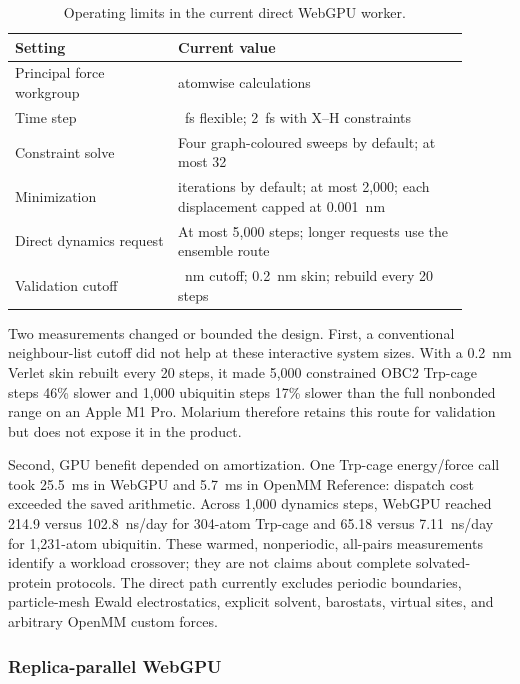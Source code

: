 \begin{table}[htbp]
  \centering
  \caption{Operating limits in the current direct WebGPU worker.}
  \label{tab:direct-operating-limits}
  \footnotesize
  \renewcommand{\arraystretch}{1.06}
  \begin{tabular}{@{}>{\raggedright\arraybackslash}p{0.32\linewidth}
                       >{\raggedright\arraybackslash}p{0.58\linewidth}@{}}
    \toprule
    Setting & Current value \\
    \midrule
    Principal force workgroup & 64 atomwise calculations \\
    Time step & 1~fs flexible; 2~fs with X--H constraints \\
    Constraint solve & Four graph-coloured sweeps by default; at most 32 \\
    Minimization & 750 iterations by default; at most 2,000; each displacement
      capped at 0.001~nm \\
    Direct dynamics request & At most 5,000 steps; longer requests use the
      ensemble route \\
    Validation cutoff & 1.0~nm cutoff; 0.2~nm skin; rebuild every 20 steps \\
    \bottomrule
  \end{tabular}
\end{table}

Two measurements changed or bounded the design. First, a conventional
neighbour-list cutoff did not help at these interactive system sizes. With a
0.2~nm Verlet skin rebuilt every 20 steps, it made 5,000 constrained OBC2
Trp-cage steps 46\% slower and 1,000 ubiquitin steps 17\% slower than the full
nonbonded range on an Apple M1 Pro. Molarium therefore retains this route for
validation but does not expose it in the product.

Second, GPU benefit depended on amortization. One Trp-cage energy/force call took
25.5~ms in WebGPU and 5.7~ms in OpenMM Reference: dispatch cost exceeded the
saved arithmetic. Across 1,000 dynamics steps, WebGPU reached 214.9 versus
102.8~ns/day for 304-atom Trp-cage and 65.18 versus 7.11~ns/day for 1,231-atom
ubiquitin. These warmed, nonperiodic, all-pairs measurements identify a workload
crossover; they are not claims about complete solvated-protein protocols. The
direct path currently excludes periodic boundaries, particle-mesh Ewald
electrostatics, explicit solvent, barostats, virtual sites, and arbitrary OpenMM
custom forces.

\subsubsection{Replica-parallel WebGPU}

